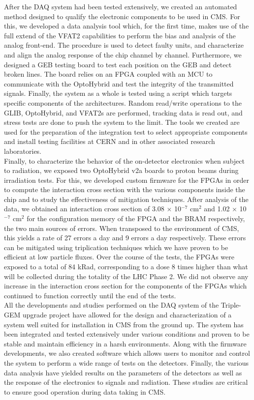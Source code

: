   After the DAQ system had been tested extensively, we created an automated method designed to qualify the electronic components to be used in CMS. For this, we developed a data analysis tool which, for the first time, makes use of the full extend of the VFAT2 capabilities to perform the bias and analysis of the analog front-end. The procedure is used to detect faulty units, and characterize and align the analog response of the chip channel by channel. Furthermore, we designed a GEB testing board to test each position on the GEB and detect broken lines. The board relies on an FPGA coupled with an MCU to communicate with the OptoHybrid and test the integrity of the transmitted signals. Finally, the system as a whole is tested using a script which targets specific components of the architectures. Random read/write operations to the GLIB, OptoHybrid, and VFAT2s are performed, tracking data is read out, and stress tests are done to push the system to the limit. The tools we created are used for the preparation of the integration test to select appropriate components and install testing facilities at CERN and in other associated research laboratories. \\

  Finally, to characterize the behavior of the on-detector electronics when subject to radiation, we exposed two OptoHybrid v2a boards to proton beams during irradiation tests. For this, we developed custom firmware for the FPGAs in order to compute the interaction cross section with the various components inside the chip and to study the effectiveness of mitigation techniques. After analysis of the data, we obtained an interaction cross section of 3.08 $ \times $ 10$^{-7}$ cm$^{2}$ and 1.02 $ \times $ 10$^{-7}$ cm$^{2}$ for the configuration memory of the FPGA and the BRAM respectively, the two main sources of errors. When transposed to the environment of CMS, this yields a rate of 27 errors a day and 9 errors a day respectively. These errors can be mitigated using triplication techniques which we have proven to be efficient at low particle fluxes. Over the course of the tests, the FPGAs were exposed to a total of 84 kRad, corresponding to a dose 8 times higher than what will be collected during the totality of the LHC Phase 2. We did not observe any increase in the interaction cross section for the components of the FPGAs which continued to function correctly until the end of the tests. \\

  All the developments and studies performed on the DAQ system of the Triple-GEM upgrade project have allowed for the design and characterization of a system well suited for installation in CMS from the ground up. The system has been integrated and tested extensively under various conditions and proven to be stable and maintain efficiency in a harsh environments. Along with the firmware developments, we also created software which allows users to monitor and control the system to perform a wide range of tests on the detectors. Finally, the various data analysis have yielded results on the parameters of the detectors as well as the response of the electronics to signals and radiation. These studies are critical to ensure good operation during data taking in CMS.



